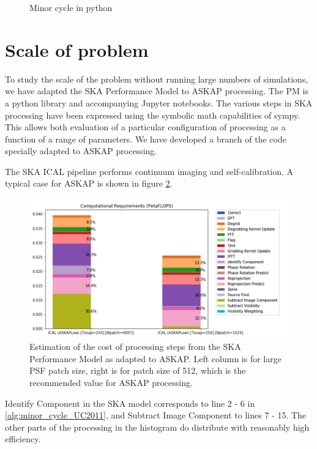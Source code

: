 \documentclass[11pt,a4paper,variablewidth]{article}
\begin{document}
\begin{figure}
\begin{tcolorbox}
\inputminted{python}{minor_cycle.py}
\end{tcolorbox}
\caption{Minor cycle in python}
\label{fig:minor_cycle_python}
\end{figure}

\clearpage

\pagebreak
\section{Scale of problem}

To study the scale of the problem without running large numbers of simulations, we have adapted the SKA Performance Model to ASKAP processing. The PM is a python library and accompanying Jupyter notebooks. The various steps in SKA processing have been expressed using the symbolic math capabilities of sympy. This allows both evaluation of a particular configuration of processing as a function of a range of parameters. We have developed a branch of the code specially adapted to ASKAP processing.

The SKA ICAL pipeline performs continuum imaging and self-calibration. A typical case for ASKAP is shown in figure \ref{fig:processing_histogram}. 

\begin{figure}[htb]
  \centering
  \includegraphics[width=\textwidth]{./pngs/processing_histogram.png}
  \caption{Estimation of the cost of processing steps from the SKA Performance Model as adapted to ASKAP. Left column is for large PSF patch size, right is for patch size of 512, which is the recommended value for ASKAP processing.}
  \label{fig:processing_histogram}
\end{figure}

Identify Component in the SKA model corresponds to line 2 - 6 in \ref{alg:minor_cycle_UC2011}, and Subtract Image Component to lines 7 - 15. The other parts of the processing in the histogram do distribute with reasonably high efficiency. 
\end{document}
